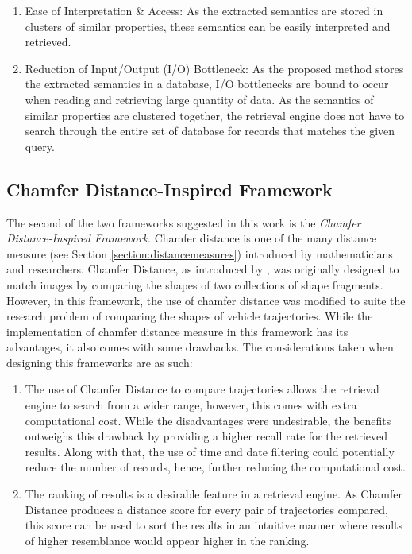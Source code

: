 \begin{enumerate}
    \item Ease of Interpretation \& Access: As the extracted semantics are stored in clusters of similar properties, these semantics can be easily interpreted and retrieved. 
    \item Reduction of Input/Output (I/O) Bottleneck: As the proposed method stores the extracted semantics in a database, I/O bottlenecks are bound to occur when reading and retrieving large quantity of data. As the semantics of similar properties are clustered together, the retrieval engine does not have to search through the entire set of database for records that matches the given query.
\end{enumerate}


\subsection{Chamfer Distance-Inspired Framework}
The second of the two frameworks suggested in this work is the \textit{Chamfer Distance-Inspired Framework}. Chamfer distance is one of the many distance measure (see Section \ref{section:distancemeasures}) introduced by mathematicians and researchers. Chamfer Distance, as introduced by \cite{barrow1977parametric}, was originally designed to match images by comparing the shapes of two collections of shape fragments. However, in this framework, the use of chamfer distance was modified to suite the research problem of comparing the shapes of vehicle trajectories. While the implementation of chamfer distance measure in this framework has its advantages, it also comes with some drawbacks. The considerations taken when designing this frameworks are as such:


\begin{enumerate}
    \item The use of Chamfer Distance to compare trajectories allows the retrieval engine to search from a wider range, however, this comes with extra computational cost. While the disadvantages were undesirable, the benefits outweighs this drawback by providing a higher recall rate for the retrieved results. Along with that, the use of time and date filtering could potentially reduce the number of records, hence, further reducing the computational cost. 
    \item The ranking of results is a desirable feature in a retrieval engine. As Chamfer Distance produces a distance score for every pair of trajectories compared, this score can be used to sort the results in an intuitive manner where results of higher resemblance would appear higher in the ranking.  
\end{enumerate}


